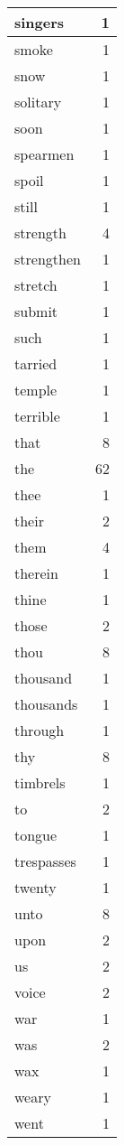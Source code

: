 \begin{center}
\begin{longtable}{l|r}
singers & 1 \\ \hline
smoke & 1 \\ \hline
snow & 1 \\ \hline
solitary & 1 \\ \hline
soon & 1 \\ \hline
spearmen & 1 \\ \hline
spoil & 1 \\ \hline
still & 1 \\ \hline
strength & 4 \\ \hline
strengthen & 1 \\ \hline
stretch & 1 \\ \hline
submit & 1 \\ \hline
such & 1 \\ \hline
tarried & 1 \\ \hline
temple & 1 \\ \hline
terrible & 1 \\ \hline
that & 8 \\ \hline
the & 62 \\ \hline
thee & 1 \\ \hline
their & 2 \\ \hline
them & 4 \\ \hline
therein & 1 \\ \hline
thine & 1 \\ \hline
those & 2 \\ \hline
thou & 8 \\ \hline
thousand & 1 \\ \hline
thousands & 1 \\ \hline
through & 1 \\ \hline
thy & 8 \\ \hline
timbrels & 1 \\ \hline
to & 2 \\ \hline
tongue & 1 \\ \hline
trespasses & 1 \\ \hline
twenty & 1 \\ \hline
unto & 8 \\ \hline
upon & 2 \\ \hline
us & 2 \\ \hline
voice & 2 \\ \hline
war & 1 \\ \hline
was & 2 \\ \hline
wax & 1 \\ \hline
weary & 1 \\ \hline
went & 1 \\ \hline

\end{longtable}
\end{center}
